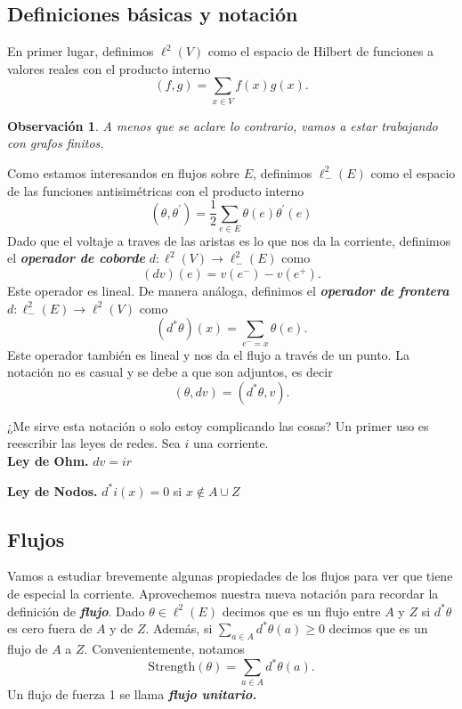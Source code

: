 \documentclass[11pt,a4paper]{article}
\newcommand{\defn}[1]{\textbf{\emph{#1}}}
\numberwithin{equation}{section}
\theoremstyle{LPplain}
\theoremstyle{LPdef}
\theoremstyle{LPrem}
\newtheorem{obs}[teo]{Observación}
\begin{document}
\subsection{Definiciones básicas y notación}
  
  En primer lugar, definimos $\ell^{2}(V)$ como el espacio de 
  Hilbert de funciones a valores reales con el producto interno
  $$(f, g) = \sum_{x \in V} f(x)g(x).$$
  \begin{obs}
  A menos que se aclare lo contrario, vamos a estar trabajando con grafos finitos.
  \end{obs}
  Como estamos interesandos en flujos sobre $E$, definimos $\ell_{-}^{2}(E)$ como 
  el espacio de las funciones antisimétricas con el producto interno
  $$(\theta, \theta^{'}) = \frac{1}{2} \sum_{e \in E} \theta(e) \theta^{'}(e)$$
  Dado que el voltaje a traves de las aristas es lo que nos da la corriente, 
  definimos el \defn{operador de coborde} $d \colon \ell^{2}(V) \to \ell^{2}_{-}(E)$ como
  $$(dv)(e) = v(e^{-}) - v(e^{+}).$$ 
  Este operador es lineal. De manera análoga, definimos el \defn{operador de frontera}
  $d \colon \ell^{2}_{-}(E) \to \ell^{2}(V) $ como 
  $$ (d^{*}\theta)(x) = \sum_{e^{-} = x} \theta(e).$$
  Este operador también es lineal y nos da el flujo a través de un punto. La notación no
  es casual y se debe a que son adjuntos, es decir 
  $$(\theta, dv) = (d^{*}\theta, v).$$

  ¿Me sirve esta notación o solo estoy complicando las cosas? Un primer uso es reescribir
  las leyes de redes. Sea $i$ una corriente. \\
  
  \hspace*{1em}\textbf{Ley de Ohm.} $dv = ir$ 

  \hspace*{1em}\textbf{Ley de Nodos.} $d^{*}i(x) = 0$ si $x \notin A \cup Z$
  
  \subsection{Flujos}
  
  Vamos a estudiar brevemente algunas propiedades de los flujos para ver que tiene de
  especial la corriente.
  Aprovechemos nuestra nueva notación para recordar la definición de \defn{flujo}.
  Dado $\theta \in \ell^{2}(E)$ decimos que es un flujo entre $A$ y $Z$ si $d^{*}\theta$ 
  es cero fuera de $A$ y de $Z$. Además, si $\sum_{a \in A} d^{*}\theta(a) \geq 0$ decimos 
  que es un flujo de $A$ a $Z$. Convenientemente, notamos
  $$\text{Strength}(\theta) = \sum_{a \in A} d^{*}\theta(a).$$
  Un flujo de fuerza 1 se llama \defn{flujo unitario.} 
\end{document}

